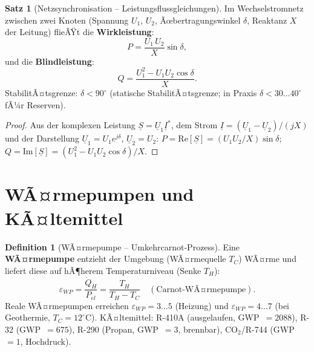 ﻿\documentclass[a4paper,12pt]{report}
\theoremstyle{definition}
\newtheorem{definition}{Definition}
\newtheorem{satz}{Satz}
\begin{document}
\begin{satz}[Netzsynchronisation -- Leistungsflussgleichungen]
Im Wechselstromnetz zwischen zwei Knoten (Spannung $U_1$, $U_2$, Ãœbertragungswinkel $\delta$,
Reaktanz $X$ der Leitung) flieÃŸt die \textbf{Wirkleistung}:
\[
  P = \frac{U_1\,U_2}{X}\sin\delta,
\]
und die \textbf{Blindleistung}:
\[
  Q = \frac{U_1^2 - U_1 U_2\cos\delta}{X}.
\]
StabilitÃ¤tsgrenze: $\delta < 90^\circ$ (statische StabilitÃ¤tsgrenze;
in Praxis $\delta < 30\ldots40^\circ$ fÃ¼r Reserven).
\end{satz}
\begin{proof}
Aus der komplexen Leistung $\underline{S} = \underline{U}_1 \underline{I}^*$,
dem Strom $\underline{I} = (\underline{U}_1 - \underline{U}_2)/(jX)$
und der Darstellung $\underline{U}_1 = U_1 e^{j\delta}$, $\underline{U}_2 = U_2$:
$P = \mathrm{Re}[\underline{S}] = (U_1 U_2/X)\sin\delta$;
$Q = \mathrm{Im}[\underline{S}] = (U_1^2 - U_1 U_2\cos\delta)/X$.
\end{proof}

\section{WÃ¤rmepumpen und KÃ¤ltemittel}

\begin{definition}[WÃ¤rmepumpe -- Umkehrcarnot-Prozess]
Eine \textbf{WÃ¤rmepumpe} entzieht der Umgebung (WÃ¤rmequelle $T_C$) WÃ¤rme
und liefert diese auf hÃ¶herem Temperaturniveau (Senke $T_H$):
\[
  \varepsilon_{WP} = \frac{\dot{Q}_H}{P_{el}} = \frac{T_H}{T_H - T_C}
  \quad (\text{Carnot-WÃ¤rmepumpe}).
\]
Reale WÃ¤rmepumpen erreichen $\varepsilon_{WP} = 3\ldots5$ (Heizung)
und $\varepsilon_{WP} = 4\ldots7$ (bei Geothermie, $T_C = 12^\circ\mathrm{C}$).
KÃ¤ltemittel: R-410A (ausgelaufen, GWP~$=2088$), R-32 (GWP~$=675$),
R-290 (Propan, GWP~$=3$, brennbar), CO$_2$/R-744 (GWP~$=1$, Hochdruck).
\end{definition}
\end{document}
